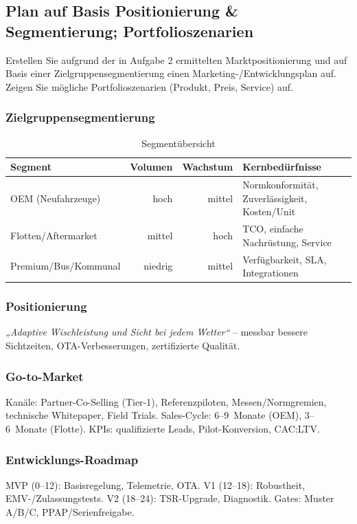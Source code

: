 \documentclass[
%
ngerman %
%
numeric %
]{wbh-assignment}
\begin{document}
\subsection{Plan auf Basis Positionierung \& Segmentierung; Portfolioszenarien}
\begin{aufgabenstellung}
Erstellen Sie aufgrund der in Aufgabe 2 ermittelten Marktpositionierung und auf Basis einer Zielgruppensegmentierung einen Marketing-/Entwicklungsplan auf.
Zeigen Sie mögliche Portfolioszenarien (Produkt, Preis, Service) auf.
\end{aufgabenstellung}

\vspace*{5mm}

\subsubsection{Zielgruppensegmentierung}
\begin{table}[htb!]
\centering
\caption{Segmentübersicht}
\begin{tabular}{l r r l}
\textbf{Segment} & \textbf{Volumen} & \textbf{Wachstum} & \textbf{Kernbedürfnisse} \\
\hline
OEM (Neufahrzeuge) & hoch & mittel & Normkonformität, Zuverlässigkeit, Kosten/Unit \\
Flotten/Aftermarket & mittel & hoch & TCO, einfache Nachrüstung, Service \\
Premium/Bus/Kommunal & niedrig & mittel & Verfügbarkeit, SLA, Integrationen \\
\end{tabular}
\end{table}

\subsubsection{Positionierung}
\emph{„Adaptive Wischleistung und Sicht bei jedem Wetter“} – messbar bessere Sichtzeiten, OTA-Verbesserungen, zertifizierte Qualität.

\subsubsection{Go-to-Market}
Kanäle: Partner-Co-Selling (Tier-1), Referenzpiloten, Messen/Normgremien, technische Whitepaper, Field Trials. Sales-Cycle: 6–9~Monate (OEM), 3–6~Monate (Flotte). KPIs: qualifizierte Leads, Pilot-Konversion, CAC:LTV.

\subsubsection{Entwicklungs-Roadmap}
MVP (0–12): Basisregelung, Telemetrie, OTA. V1 (12–18): Robustheit, EMV-/Zulassungstests. V2 (18–24): TSR-Upgrade, Diagnostik. Gates: Muster A/B/C, PPAP/Serienfreigabe.
\end{document}
